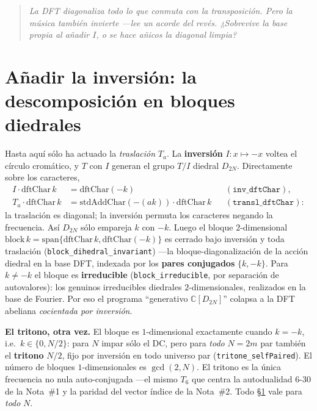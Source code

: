 \documentclass[11pt]{article}
\newcommand{\lean}[1]{\texttt{#1}}
\newcommand{\qlink}[1]{\par\medskip\begin{quote}\itshape\small\color{ctB!88!black}#1\end{quote}\medskip}
\begin{document}
\qlink{La DFT diagonaliza todo lo que conmuta con la transposici\'on. Pero la m\'usica tambi\'en
\emph{invierte} ---lee un acorde del rev\'es. ¿Sobrevive la base propia al a\~nadir $I$, o se hace a\~nicos
la diagonal limpia?}

\section{A\~nadir la inversi\'on: la descomposici\'on en bloques diedrales}\label{sec:dihedral}

Hasta aqu\'i s\'olo ha actuado la \emph{traslaci\'on} $T_a$. La \textbf{inversi\'on} $I:x\mapsto-x$ voltea el
c\'irculo crom\'atico, y $T$ con $I$ generan el grupo $T/I$ diedral $D_{2N}$. Directamente sobre los
caracteres,
\[
\begin{aligned}
  I\cdot\mathrm{dftChar}\,k &= \mathrm{dftChar}(-k) && (\lean{inv\_dftChar}),\\[2pt]
  T_a\cdot\mathrm{dftChar}\,k &= \mathrm{stdAddChar}(-(ak))\cdot\mathrm{dftChar}\,k && (\lean{transl\_dftChar}):
\end{aligned}
\]
la traslaci\'on es diagonal; la inversi\'on permuta los caracteres negando la frecuencia. As\'i $D_{2N}$ s\'olo
empareja $k$ con $-k$. Luego el bloque $2$-dimensional $\mathrm{block}\,k=\mathrm{span}\{\mathrm{dftChar}\,k,
\mathrm{dftChar}(-k)\}$ es cerrado bajo inversi\'on y toda traslaci\'on (\lean{block\_dihedral\_invariant})
---la bloque-diagonalizaci\'on de la acci\'on diedral en la base DFT, indexada por los \textbf{pares
conjugados} $\{k,-k\}$. Para $k\neq-k$ el bloque es \textbf{irreducible} (\lean{block\_irreducible}, por
separaci\'on de autovalores): los genuinos irreducibles diedrales $2$-dimensionales, realizados en la base de
Fourier. Por eso el programa ``generativo $\mathbb{C}[D_{2N}]$'' colapsa a la DFT abeliana \emph{cocientada
por inversi\'on}.

\textbf{El tritono, otra vez.} El bloque es $1$-dimensional exactamente cuando $k=-k$, i.e.\ $k\in\{0,N/2\}$:
para $N$ impar s\'olo el DC, pero para \emph{todo} $N=2m$ par tambi\'en el \textbf{tritono} $N/2$, fijo por
inversi\'on en todo universo par (\lean{tritone\_selfPaired}). El n\'umero de bloques $1$-dimensionales es
$\gcd(2,N)$. El tritono es la \'unica frecuencia no nula auto-conjugada ---el mismo $T_6$ que centra la
autodualidad 6-30 de la Nota~\#1 y la paridad del vector \'indice de la Nota~\#2. Todo \S\ref{sec:dihedral}
vale para \emph{todo} $N$.
\end{document}
